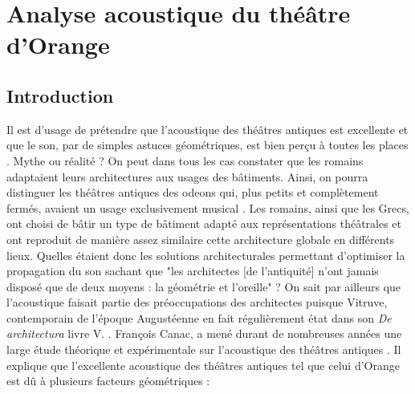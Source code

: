 \part{Analyse acoustique du théâtre d'Orange}
\label{part3}

\chapter*{Introduction}
	
 Il est d'usage de prétendre que l'acoustique des théâtres antiques est excellente et que le son, par de simples astuces géométriques, est bien perçu à toutes les places \cite[p.42]{formige}. Mythe ou réalité ? On peut dans tous les cas constater que les romains adaptaient leurs architectures aux usages des bâtiments. Ainsi, on pourra distinguer les théâtres antiques des \glspl{odeon} qui, plus petits et complètement fermés, avaient un usage exclusivement musical \cite[p.1]{roofodeon}. Les romains, ainsi que les Grecs, ont choisi de bâtir un type de bâtiment adapté aux représentations théâtrales et ont reproduit de manière assez similaire cette architecture globale en différents lieux. Quelles étaient donc les solutions architecturales permettant d'optimiser la propagation du son sachant que "les architectes [de l'antiquité] n'ont jamais disposé que de deux moyens : la géométrie et l'oreille" \cite[p.15]{canac} ? On sait par ailleurs que l'acoustique faisait partie des préoccupations des architectes puisque Vitruve, contemporain de l'époque Augustéenne en fait régulièrement état dans son \textit{De architectura} livre V. \cite[Livre V]{vitruve}. François Canac, a mené durant de nombreuses années une large étude théorique et expérimentale sur l'acoustique des théâtres antiques \cite{canac}. Il explique que l'excellente acoustique des théâtres antiques tel que celui d'Orange est dû à plusieurs facteurs géométriques :
